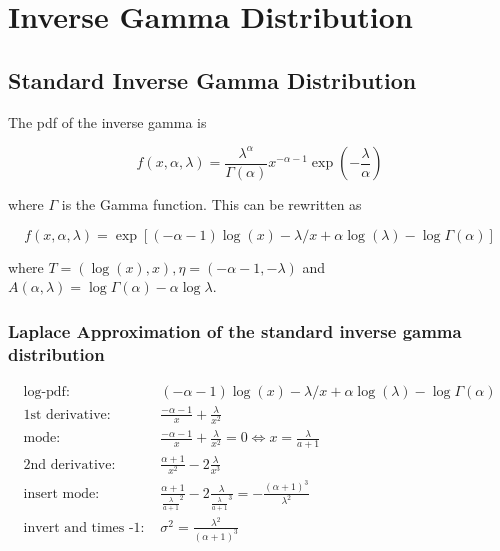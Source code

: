 \section{Inverse Gamma Distribution}

\subsection{Standard Inverse Gamma Distribution}

The pdf of the inverse gamma is 

\begin{equation}
	f(x, \alpha, \lambda) = \frac{\lambda^{\alpha}}{\Gamma(\alpha)} x^{-\alpha-1} \exp(-\frac{\lambda}{\alpha})
	\label{eq:pdf_inverse_gamma}
\end{equation}

where $\Gamma$ is the Gamma function. This can be rewritten as

\begin{equation}
	f(x, \alpha, \lambda) = \exp \left[(-\alpha-1)\log(x) - \lambda/x + \alpha \log(\lambda) -\log\Gamma(\alpha)\right]
	\label{eq:exp_inverse_gamma}
\end{equation}

where $T=(\log(x), x), \eta= (-\alpha-1, -\lambda)$ and $A(\alpha,\lambda) = \log\Gamma(\alpha) - \alpha\log\lambda$.

\subsubsection{Laplace Approximation of the standard inverse gamma distribution}

\begin{align*}
\text{log-pdf: } &(-\alpha-1)\log(x) - \lambda/x + \alpha \log(\lambda) -\log\Gamma(\alpha) \\
\text{1st derivative: }&  \frac{-\alpha-1}{x} + \frac{\lambda}{x^2}\\
\text{mode: }& \frac{-\alpha-1}{x} + \frac{\lambda}{x^2} = 0 \Leftrightarrow x = \frac{\lambda}{a+1}\\
\text{2nd derivative: }&  \frac{\alpha+1}{x^2} - 2\frac{\lambda}{x^3}\\
\text{insert mode: }& \frac{\alpha+1}{\frac{\lambda}{a+1}^2} - 2\frac{\lambda}{\frac{\lambda}{a+1}^3} = -\frac{(\alpha +1)^3}{\lambda^2} \\
\text{invert and times -1: }&\sigma^2 = \frac{\lambda^2}{(\alpha +1)^3}
\end{align*}

